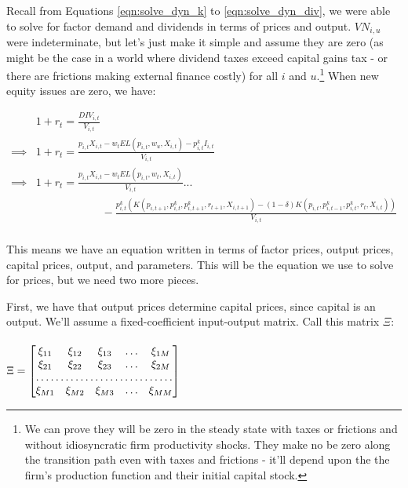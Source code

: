 \documentclass[letterpaper,12pt]{article}
\theoremstyle{definition}
\begin{document}
\begin{spacing}{1.5}
Recall from Equations \ref{eqn:solve_dyn_k} to \ref{eqn:solve_dyn_div}, we were able to solve for factor demand and dividends in terms of prices and output.  $VN_{i,u}$ were indeterminate, but let's just make it simple and assume they are zero (as might be the case in a world where dividend taxes exceed capital gains tax - or there are frictions making external finance costly) for all $i$ and $u$.\footnote{We can prove they will be zero in the steady state with taxes or frictions and without idiosyncratic firm productivity shocks.  They make no be zero along the transition path even with taxes and frictions - it'll depend upon the the firm's production function and their initial capital stock.}  When new equity issues are zero, we have:

\begin{equation}
\label{eqn:price_det}
\begin{split}
& 1+r_{t} = \frac{DIV_{i,t}}{V_{i,t}} \\
\implies &  1+r_{t} = \frac{ p_{i,t}X_{i,t} - w_{t}EL(p_{i,t},w_{u},X_{i,t}) - p^{k}_{i,t}I_{i,t}}{V_{i,t}} \\
\implies &  1+r_{t} = \frac{ p_{i,t}X_{i,t} - w_{t}EL(p_{i,t},w_{t},X_{i,t})}{V_{i,t}}... \\
 & \quad\quad\quad\quad\quad\quad - \frac{p^{k}_{i,t}(K(p_{i,t+1},p^{k}_{i,t},p^{k}_{i,t+1},r_{t+1},X_{i,t+1}) - (1-\delta)K(p_{i,t},p^{k}_{i,t-1},p^{k}_{i,t},r_{t},X_{i,t}))}{V_{i,t}} \\
\end{split}
\end{equation}


This means we have an equation written in terms of factor prices, output prices, capital prices, output, and parameters.  This will be the equation we use to solve for prices, but we need two more pieces. 

First, we have that output prices determine capital prices, since capital is an output.  We'll assume a fixed-coefficient input-output matrix.  Call this matrix $\Xi$: \\

 \ \\
$\Xi=
\begin{bmatrix}
    \xi_{11}       & \xi_{12} & \xi_{13} & \dots & \xi_{1M} \\
    \xi_{21}       & \xi_{22} & \xi_{23} & \dots & \xi_{2M} \\
    \hdotsfor{5} \\
    \xi_{M1}       & \xi_{M2} & \xi_{M3} & \dots & \xi_{MM}
\end{bmatrix}$
\ \\


\end{spacing}
\end{document}
